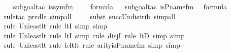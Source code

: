 \begin{isabellebody}
\ \ \isamarkupfalse%
{\isacharparenleft}{\kern0pt}subgoal{\isacharunderscore}{\kern0pt}tac\ {\isachardoublequoteopen}is{\isacharunderscore}{\kern0pt}sym{\isacharunderscore}{\kern0pt}fm{\isacharparenleft}{\kern0pt}{}{\isacharcomma}{\kern0pt}\ {}{\isacharcomma}{\kern0pt}\ {}{\isacharcomma}{\kern0pt}\ {}{\isacharparenright}{\kern0pt}\ {\isasymin}\ formula{\isachardoublequoteclose}{\isacharparenright}{\kern0pt}\isanewline
\ \ \isamarkupfalse%
{\isacharparenleft}{\kern0pt}subgoal{\isacharunderscore}{\kern0pt}tac\ {\isachardoublequoteopen}is{\isacharunderscore}{\kern0pt}P{\isacharunderscore}{\kern0pt}name{\isacharunderscore}{\kern0pt}fm{\isacharparenleft}{\kern0pt}{}{\isacharcomma}{\kern0pt}\ {}{\isacharparenright}{\kern0pt}\ {\isasymin}\ formula{\isachardoublequoteclose}{\isacharparenright}{\kern0pt}\isanewline
\ \ \ \ \isamarkupfalse%
{\isacharparenleft}{\kern0pt}rule{\isacharunderscore}{\kern0pt}tac\ pred{\isacharunderscore}{\kern0pt}le{\isacharcomma}{\kern0pt}\ simp{\isacharunderscore}{\kern0pt}all{\isacharparenright}{\kern0pt}{\isacharplus}{\kern0pt}\isanewline
\ \ \ \ \isamarkupfalse%
{\isacharparenleft}{\kern0pt}subst\ succ{\isacharunderscore}{\kern0pt}Un{\isacharunderscore}{\kern0pt}distrib{\isacharcomma}{\kern0pt}\ simp{\isacharunderscore}{\kern0pt}all{\isacharparenright}{\kern0pt}{\isacharplus}{\kern0pt}\isanewline
\ \ \ \ \isamarkupfalse%
{\isacharparenleft}{\kern0pt}rule\ Un{\isacharunderscore}{\kern0pt}least{\isacharunderscore}{\kern0pt}lt{\isacharcomma}{\kern0pt}\ rule\ ltI{\isacharcomma}{\kern0pt}\ simp{\isacharcomma}{\kern0pt}\ simp{\isacharparenright}{\kern0pt}\isanewline
\ \ \ \ \ \isamarkupfalse%
{\isacharparenleft}{\kern0pt}rule\ Un{\isacharunderscore}{\kern0pt}least{\isacharunderscore}{\kern0pt}lt{\isacharcomma}{\kern0pt}\ rule\ ltI{\isacharcomma}{\kern0pt}\ simp{\isacharcomma}{\kern0pt}\ rule\ disjI{}{\isacharcomma}{\kern0pt}\ rule\ ltD{\isacharcomma}{\kern0pt}\ simp{\isacharcomma}{\kern0pt}\ simp{\isacharparenright}{\kern0pt}{\isacharplus}{\kern0pt}\isanewline
\ \ \ \ \ \isamarkupfalse%
{\isacharparenleft}{\kern0pt}rule\ Un{\isacharunderscore}{\kern0pt}least{\isacharunderscore}{\kern0pt}lt{\isacharcomma}{\kern0pt}\ rule\ le{\isacharunderscore}{\kern0pt}lt{\isacharunderscore}{\kern0pt}lt{\isacharcomma}{\kern0pt}\ rule\ arity{\isacharunderscore}{\kern0pt}is{\isacharunderscore}{\kern0pt}P{\isacharunderscore}{\kern0pt}name{\isacharunderscore}{\kern0pt}fm{\isacharcomma}{\kern0pt}\ simp{\isacharcomma}{\kern0pt}\ simp{\isacharparenright}{\kern0pt}\isanewline

\end{isabellebody}
